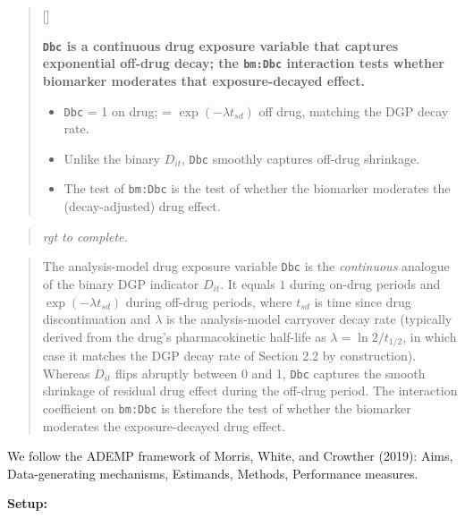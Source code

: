 \documentclass[
  11pt,
]{article}
\newcounter{pgraph}
\newenvironment{bullets}{%
  \stepcounter{pgraph}%
  \begin{quote}\small\sffamily\color[gray]{0.30}%
  {\normalfont\scriptsize\color[gray]{0.58}[\thepgraph]\enspace}}{%
  \end{quote}}
\newenvironment{rgt}{%
  \begin{quote}\small\itshape\color[RGB]{20,60,160}}{%
  \end{quote}}
\newenvironment{orig}{%
  \begin{quote}\normalsize\color[gray]{0.55}}{%
  \end{quote}}
\begin{document}
\begin{bullets}

\textbf{\texttt{Dbc} is a continuous drug exposure variable
that captures exponential off-drug decay; the \texttt{bm:Dbc}
interaction tests whether biomarker moderates that
exposure-decayed effect.}

\begin{itemize}\setlength{\itemsep}{2pt}\setlength{\parskip}{0pt}
\item \texttt{Dbc} = 1 on drug; = $\exp(-\lambda t_{sd})$ off
  drug, matching the DGP decay rate.
\item Unlike the binary $D_{it}$, \texttt{Dbc} smoothly
  captures off-drug shrinkage.
\item The test of \texttt{bm:Dbc} is the test of whether the
  biomarker moderates the (decay-adjusted) drug effect.
\end{itemize}

\end{bullets}

\begin{rgt}
rgt to complete.

\end{rgt}

\begin{orig}
The analysis-model drug exposure variable \texttt{Dbc} is the
\emph{continuous} analogue of the binary DGP indicator \(D_{it}\). It
equals \(1\) during on-drug periods and \(\exp(-\lambda t_{sd})\) during
off-drug periods, where \(t_{sd}\) is time since drug discontinuation
and \(\lambda\) is the analysis-model carryover decay rate (typically
derived from the drug's pharmacokinetic half-life as
\(\lambda = \ln 2 / t_{1/2}\), in which case it matches the DGP decay
rate of Section 2.2 by construction). Whereas \(D_{it}\) flips abruptly
between 0 and 1, \texttt{Dbc} captures the smooth shrinkage of residual
drug effect during the off-drug period. The interaction coefficient on
\texttt{bm:Dbc} is therefore the test of whether the biomarker moderates
the exposure-decayed drug effect.

\end{orig}

We follow the ADEMP framework of Morris, White, and Crowther (2019):
Aims, Data-generating mechanisms, Estimands, Methods, Performance
measures.

\textbf{Setup:}
\end{document}

